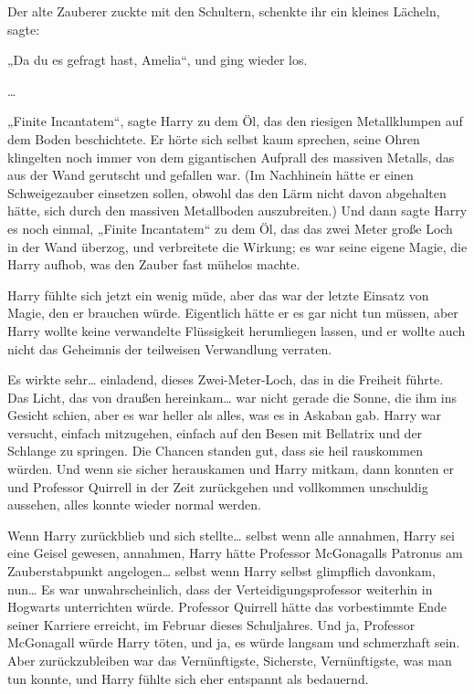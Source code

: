 {Der alte Zauberer zuckte mit den Schultern, schenkte ihr ein kleines Lächeln, sagte:

„Da du es gefragt hast, Amelia“, und ging wieder los.

…

„Finite Incantatem“, sagte Harry zu dem Öl, das den riesigen Metallklumpen auf dem Boden beschichtete. Er hörte sich selbst kaum sprechen, seine Ohren klingelten noch immer von dem gigantischen Aufprall des massiven Metalls, das aus der Wand gerutscht und gefallen war. (Im Nachhinein hätte er einen Schweigezauber einsetzen sollen, obwohl das den Lärm nicht davon abgehalten hätte, sich durch den massiven Metallboden auszubreiten.) Und dann sagte Harry es noch einmal, „Finite Incantatem“ zu dem Öl, das das zwei Meter große Loch in der Wand überzog, und verbreitete die Wirkung; es war seine eigene Magie, die Harry aufhob, was den Zauber fast mühelos machte.

Harry fühlte sich jetzt ein wenig müde, aber das war der letzte Einsatz von Magie, den er brauchen würde. Eigentlich hätte er es gar nicht tun müssen, aber Harry wollte keine verwandelte Flüssigkeit herumliegen lassen, und er wollte auch nicht das Geheimnis der teilweisen Verwandlung verraten.

Es wirkte sehr… einladend, dieses Zwei-Meter-Loch, das in die Freiheit führte. Das Licht, das von draußen hereinkam… war nicht gerade die Sonne, die ihm ins Gesicht schien, aber es war heller als alles, was es in Askaban gab. Harry war versucht, einfach mitzugehen, einfach auf den Besen mit Bellatrix und der Schlange zu springen. Die Chancen standen gut, dass sie heil rauskommen würden. Und wenn sie sicher herauskamen und Harry mitkam, dann konnten er und Professor Quirrell in der Zeit zurückgehen und vollkommen unschuldig aussehen, alles konnte wieder normal werden.

Wenn Harry zurückblieb und sich stellte… selbst wenn alle annahmen, Harry sei eine Geisel gewesen, annahmen, Harry hätte Professor McGonagalls Patronus am Zauberstabpunkt angelogen… selbst wenn Harry selbst glimpflich davonkam, nun… Es war unwahrscheinlich, dass der Verteidigungsprofessor weiterhin in Hogwarts unterrichten würde. Professor Quirrell hätte das vorbestimmte Ende seiner Karriere erreicht, im Februar dieses Schuljahres. Und ja, Professor McGonagall würde Harry töten, und ja, es würde langsam und schmerzhaft sein. Aber zurückzubleiben war das Vernünftigste, Sicherste, Vernünftigste, was man tun konnte, und Harry fühlte sich eher entspannt als bedauernd.

}
